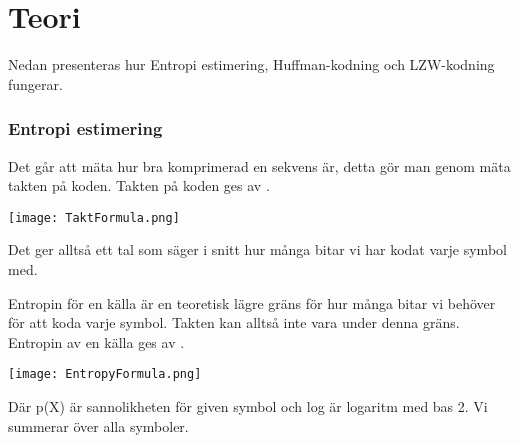 
\chapter{Teori}
\label{cha:theory}

Nedan presenteras hur Entropi estimering, Huffman-kodning och LZW-kodning fungerar.

\subsection{Entropi estimering}
Det går att mäta hur bra komprimerad en sekvens är, detta gör man genom mäta takten på koden. Takten på koden ges av \cite{nautsch2018}.

\bigskip
\noindent\texttt{[image: TaktFormula.png]}

\bigskip 
\noindent Det ger alltså ett tal som säger i snitt hur många bitar vi har kodat varje symbol med.

Entropin för en källa är en teoretisk lägre gräns för hur många bitar vi behöver för att koda varje symbol. Takten kan alltså inte vara under denna gräns. Entropin av en källa ges av \cite{nautsch2018}.

\bigskip 
\texttt{[image: EntropyFormula.png]}

\bigskip 
\noindent Där p(X) är sannolikheten för given symbol och log är logaritm med bas 2. Vi summerar över alla symboler.


